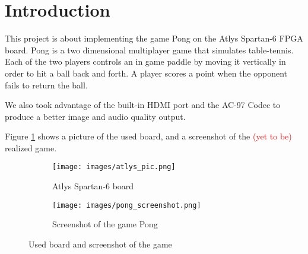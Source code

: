 \section{Introduction}
	This project is about implementing the game Pong on the Atlys Spartan-6 FPGA board. Pong is a two dimensional multiplayer game that simulates table-tennis. Each of the two players controls an in game paddle by moving it vertically in order to hit a ball back and forth. A player scores a point when the opponent fails to return the ball. 
	
	We also took advantage of the built-in HDMI port and the AC-97 Codec to produce a better image and audio quality output. 
	
	Figure \ref{board+screenshot} shows a picture of the used board, and a screenshot of the \textcolor{red}{(yet to be)} realized game. 
	
	\begin{figure}[h]
		\begin{subfigure}[b]{.4\textwidth}
			\texttt{[image: images/atlys\_pic.png]}
			\caption{Atlys Spartan-6 board}
		\end{subfigure}
		\hfill
		\begin{subfigure}[b]{.4\textwidth}
			\texttt{[image: images/pong\_screenshot.png]}		
			\caption{Screenshot of the game Pong}
		\end{subfigure}
		
	\caption{Used board and screenshot of the game}
	\label{board+screenshot}
	\end{figure}
	
		
		

